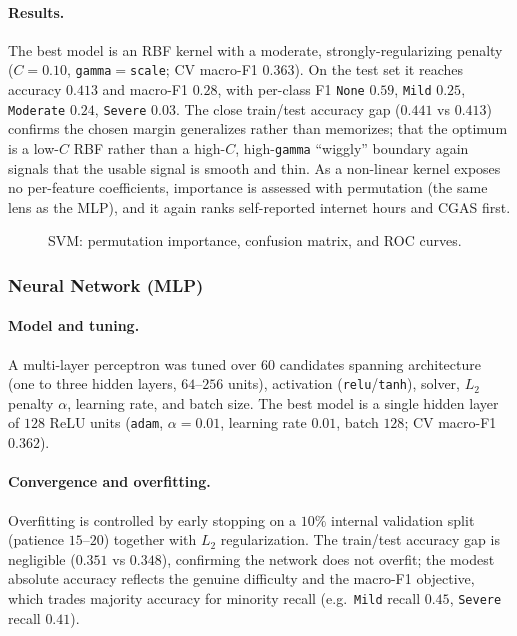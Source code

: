 \paragraph{Results.} The best model is an RBF kernel with a moderate, strongly-regularizing penalty ($C=0.10$, \texttt{gamma}$=$\texttt{scale}; CV macro-F1 $0.363$). On the test set it reaches accuracy $0.413$ and macro-F1 $0.28$, with per-class F1 \texttt{None} $0.59$, \texttt{Mild} $0.25$, \texttt{Moderate} $0.24$, \texttt{Severe} $0.03$. The close train/test accuracy gap ($0.441$ vs $0.413$) confirms the chosen margin generalizes rather than memorizes; that the optimum is a low-$C$ RBF rather than a high-$C$, high-\texttt{gamma} ``wiggly'' boundary again signals that the usable signal is smooth and thin. As a non-linear kernel exposes no per-feature coefficients, importance is assessed with permutation (the same lens as the MLP), and it again ranks self-reported internet hours and CGAS first.

\begin{figure}[h]
    \centering
    \caption{SVM: permutation importance, confusion matrix, and ROC curves.}
    \label{fig:cmi_svm}
\end{figure}

\subsubsection{Neural Network (MLP)}
\paragraph{Model and tuning.} A multi-layer perceptron \cite{sklearn} was tuned over $60$ candidates spanning architecture (one to three hidden layers, $64$--$256$ units), activation (\texttt{relu}/\texttt{tanh}), solver, $L_2$ penalty $\alpha$, learning rate, and batch size. The best model is a single hidden layer of $128$ ReLU units (\texttt{adam}, $\alpha=0.01$, learning rate $0.01$, batch $128$; CV macro-F1 $0.362$).
\paragraph{Convergence and overfitting.} Overfitting is controlled by early stopping on a $10\%$ internal validation split (patience $15$--$20$) together with $L_2$ regularization. The train/test accuracy gap is negligible ($0.351$ vs $0.348$), confirming the network does not overfit; the modest absolute accuracy reflects the genuine difficulty and the macro-F1 objective, which trades majority accuracy for minority recall (e.g.\ \texttt{Mild} recall $0.45$, \texttt{Severe} recall $0.41$).
